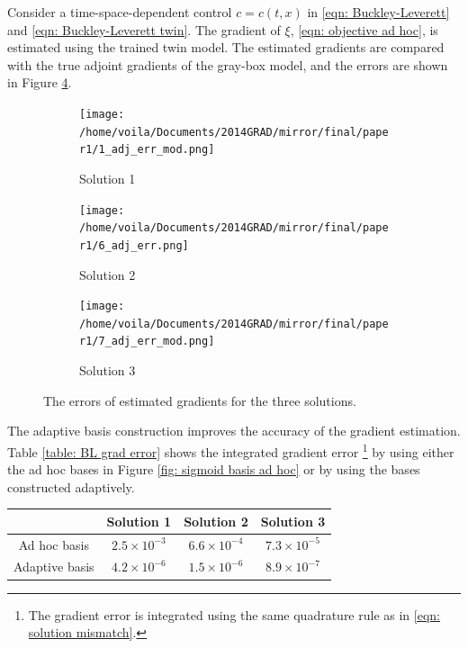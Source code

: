 Consider a time-space-dependent control $c=c(t,x)$ in \eqref{eqn: Buckley-Leverett} and 
\eqref{eqn: Buckley-Leverett twin}. The gradient of $\xi$, \eqref{eqn: objective ad hoc}, is
estimated using the trained twin model. The estimated gradients are compared with the true adjoint
gradients of the gray-box model, and the errors are shown in Figure \ref{fig: adap basis grad err BL}.\\
\begin{figure}[htbp]\begin{center}
    \begin{subfigure}[t]{.32\textwidth}
        \centering
        \texttt{[image: /home/voila/Documents/2014GRAD/mirror/final/paper1/1\_adj\_err\_mod.png]}
        \caption{Solution 1}
        \label{fig: grad BL 1}
    \end{subfigure}
    \begin{subfigure}[t]{.32\textwidth}     
        \centering
        \texttt{[image: /home/voila/Documents/2014GRAD/mirror/final/paper1/6\_adj\_err.png]}
        \caption{Solution 2}
        \label{fig: grad BL 2}
    \end{subfigure}
    \begin{subfigure}[t]{.32\textwidth}
        \centering
        \texttt{[image: /home/voila/Documents/2014GRAD/mirror/final/paper1/7\_adj\_err\_mod.png]}
        \caption{Solution 3}
        \label{fig: grad BL 3}
    \end{subfigure}
    \caption{The errors of estimated gradients for the three solutions.}
    \label{fig: adap basis grad err BL}
\end{center}\end{figure}

The adaptive basis construction improves the accuracy of the gradient estimation.
Table \ref{table: BL grad error} shows the integrated gradient error 
\footnote{The gradient error is integrated using the same quadrature rule as in 
\eqref{eqn: solution mismatch}.} by using either the
ad hoc bases in Figure \ref{fig: sigmoid basis ad hoc} or by using the bases constructed adaptively.\\
\begin{center}
    \begin{tabular}{|c|c|c|c|}
       \hline\hline
         & Solution 1 & Solution 2 & Solution 3\\
       \hline
       Ad hoc basis & $2.5\times 10^{-3}$& $6.6\times 10^{-4}$ & $7.3\times 10^{-5}$ \\
       \hline
       Adaptive basis & $4.2\times 10^{-6}$& $1.5\times 10^{-6}$ & $8.9\times 10^{-7}$ \\
       \hline\hline
    \end{tabular}
    \label{table: BL grad error}
\end{center}


